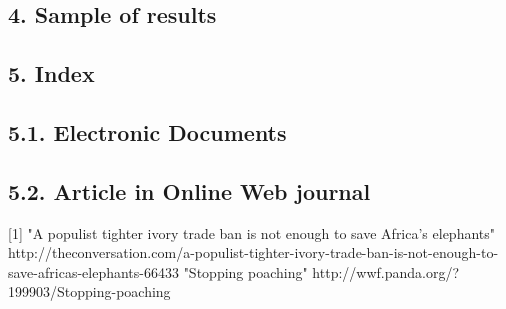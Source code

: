 \documentclass[12pt]{article}
\begin{document}
\subsection*{4. Sample of results}





\subsection*{5. Index}
\subsection *{5.1. Electronic Documents}
\subsection *{5.2. Article in Online Web journal}
[1] "A populist tighter ivory trade ban is not enough to save Africa’s elephants" \newline
 http://theconversation.com/a-populist-tighter-ivory-trade-ban-is-not-enough-to-save-africas-elephants-66433 \newline
[2] "Stopping poaching" \newline
 http://wwf.panda.org/?199903/Stopping-poaching
\end{document}

